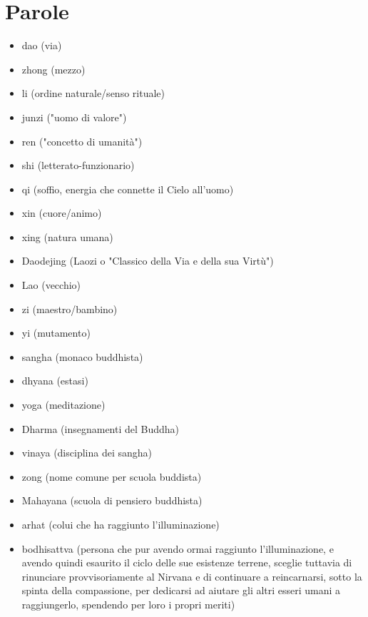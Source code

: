 \documentclass[10pt,a4paper]{report}
\begin{document}
\section{Parole}
\begin{itemize}
	\item dao (via)
	\item zhong (mezzo)
	\item li (ordine naturale/senso rituale)
	\item junzi ("uomo di valore")
	\item ren ("concetto di umanità")
	\item shi (letterato-funzionario)
	\item qi (soffio, energia che connette il Cielo all'uomo)
	\item xin (cuore/animo)
	\item xing (natura umana)
	\item Daodejing (Laozi o "Classico della Via e della sua Virtù")
	\item Lao (vecchio)
	\item zi (maestro/bambino)
	\item yi (mutamento)
	\item sangha (monaco buddhista)
	\item dhyana (estasi)
	\item yoga (meditazione)
	\item Dharma (insegnamenti del Buddha)
	\item vinaya (disciplina dei sangha)
	\item zong (nome comune per scuola buddista)
	\item Mahayana (scuola di pensiero buddhista)
	\item arhat (colui che ha raggiunto l'illuminazione)
	\item bodhisattva (persona che pur avendo ormai raggiunto l'illuminazione, e avendo quindi esaurito il ciclo delle sue esistenze terrene, sceglie tuttavia di rinunciare provvisoriamente al Nirvana e di continuare a reincarnarsi, sotto la spinta della compassione, per dedicarsi ad aiutare gli altri esseri umani a raggiungerlo, spendendo per loro i propri meriti)
\end{itemize}
\end{document}
